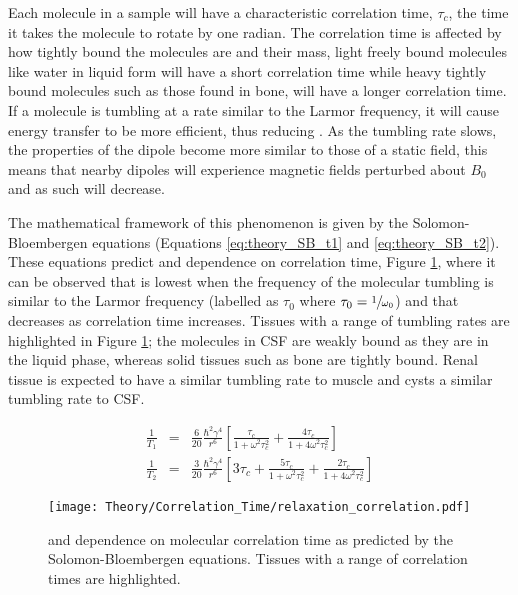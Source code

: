 Each molecule in a sample will have a characteristic correlation time, $\tau_c$, the time it takes the molecule to rotate by one radian. The correlation time is affected by how tightly bound the molecules are and their mass, light freely bound molecules like water in liquid form will have a short correlation time while heavy tightly bound molecules such as those found in bone, will have a longer correlation time. If a molecule is tumbling at a rate similar to the Larmor frequency, it will cause energy transfer to be more efficient, thus reducing \tone. As the tumbling rate slows, the properties of the dipole become more similar to those of a static field, this means that nearby dipoles will experience magnetic fields perturbed about $B_0$ and as such \ttwo will decrease.

\newpage
The mathematical framework of this phenomenon is given by the Solomon-Bloembergen equations \cite{solomon_relaxation_1955} (Equations \eqref{eq:theory_SB_t1} and \eqref{eq:theory_SB_t2}). These equations predict \tone and \ttwo dependence on correlation time, Figure \ref{fig:theory_relaxation_correlation}, where it can be observed that \tone is lowest when the frequency of the molecular tumbling is similar to the Larmor frequency (labelled as $\tau_0$ where $\tau_0=\sfrac{1}{\omega_0}$) and that \ttwo decreases as correlation time increases. Tissues with a range of tumbling rates are highlighted in Figure \ref{fig:theory_relaxation_correlation}; the molecules in \ac{CSF} are weakly bound as they are in the liquid phase, whereas solid tissues such as bone are tightly bound. Renal tissue is expected to have a similar tumbling rate to muscle and cysts a similar tumbling rate to \ac{CSF}.

\begin{eqnarray}
	\frac{1}{T_1}&=& \frac{6}{20}\frac{\hbar^2\gamma^4}{r^6}\left[ \frac{\tau_c}{1 + \omega^2\tau_c^2} + \frac{4\tau_c}{1 + 4\omega^2\tau_c^2}\right]
	\label{eq:theory_SB_t1}\\
	\frac{1}{T_2}&=& \frac{3}{20}\frac{\hbar^2\gamma^4}{r^6}\left[ 3\tau_c +  \frac{5\tau_c}{1 + \omega^2\tau_c^2} + \frac{2\tau_c}{1 + 4\omega^2\tau_c^2}\right]
	\label{eq:theory_SB_t2}
\end{eqnarray}
\begin{figure}[H]
	\centering
	\texttt{[image: Theory/Correlation\_Time/relaxation\_correlation.pdf]}
	\caption{\tone and \ttwo dependence on molecular correlation time as predicted by the Solomon-Bloembergen equations. Tissues with a range of correlation times are highlighted.}
	\label{fig:theory_relaxation_correlation}	
\end{figure}

